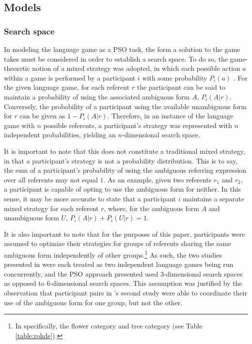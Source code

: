 \documentclass[12pt,a4paper]{article}
\begin{document}
\subsection{Models}
\subsubsection{Search space}
\label{sec:search_space}

In modeling the \citeauthor{rohde2012} language game as a PSO task, the form a solution to the game takes must be considered in order to establish a search space.  To do so, the game-theoretic notion of a mixed strategy was adopted, in which each possible action $a$ within a game is performed by a participant $i$ with some probability $P_i(a)$ \citep{benz2005}. For the given language game, for each referent $r$ the participant can be said to maintain a probability of using the associated ambiguous form $A$, $P_i(A|r)$. Conversely, the probability of a participant using the available unambiguous form for $r$ can be given as $1 - P_i(A|r)$. Therefore, in an instance of the \citeauthor{rohde2012} language game with $n$ possible referents, a participant's strategy was represented with $n$ independent probabilities, yielding an $n$-dimensional search space. 

It is important to note that this does not constitute a traditional mixed strategy, in that a participant's strategy is not a probability distribution. This is to say, the sum of a participant's probability of using the ambiguous referring expression over all referents may not equal $1$. As an example, given two referents $r_1$ and $r_2$, a participant is capable of opting to use the ambiguous form for neither. In this sense, it may be more accurate to state that a participant $i$ maintains a separate mixed strategy for each referent $r$, where, for the ambiguous form $A$ and unambiguous form $U$, $P_i(A|r) + P_i(U|r) = 1$.

It is also important to note that for the purposes of this paper, participants were assumed to optimize their strategies for groups of referents sharing the same ambiguous form independently of other groups.\footnote{In \citeauthor{rohde2012} specifically, the flower category and tree category (see Table \ref{table:rohde}).} As such, the two studies presented in \citeauthor{rohde2012} were each treated as two independent language games being run concurrently, and the PSO approach presented used 3-dimensional search spaces as opposed to 6-dimensional search spaces. This assumption was justified by the observation that participant pairs in \citeauthor{rohde2012}'s second study were able to coordinate their use of the ambiguous form for one group, but not the other. 
\end{document}
